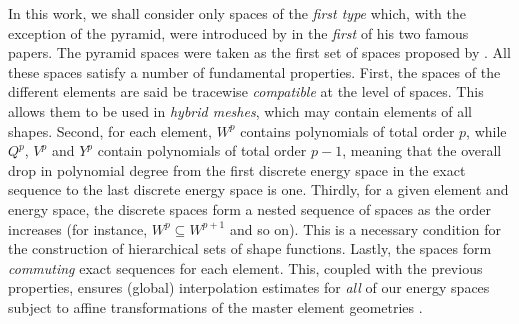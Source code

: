 In this work, we shall consider only spaces of the \textit{first type} which, with the exception of the pyramid, were introduced by \citet{Nedelec80} in the \textit{first} of his two famous papers.
The pyramid spaces were taken as the first set of spaces proposed by \citet{Nigam_Phillips_11}.
All these spaces satisfy a number of fundamental properties.
First, the spaces of the different elements are said be tracewise \textit{compatible} at the level of spaces.
This allows them to be used in \textit{hybrid meshes}, which may contain elements of all shapes.
Second, for each element, $W^p$ contains polynomials of total order $p$, while $Q^p$, $V^p$ and $Y^p$ contain polynomials of total order $p-1$, meaning that the overall drop in polynomial degree from the first discrete energy space in the exact sequence to the last discrete energy space is one.
Thirdly, for a given element and energy space, the discrete spaces form a nested sequence of spaces as the order increases (for instance, $W^p\subseteq W^{p+1}$ and so on).
This is a necessary condition for the construction of hierarchical sets of shape functions.
Lastly, the spaces form \textit{commuting} exact sequences for each element.
This, coupled with the previous properties, ensures (global) interpolation estimates for \textit{all} of our energy spaces subject to affine transformations of the master element geometries \citep{monk_demkowicz}.


